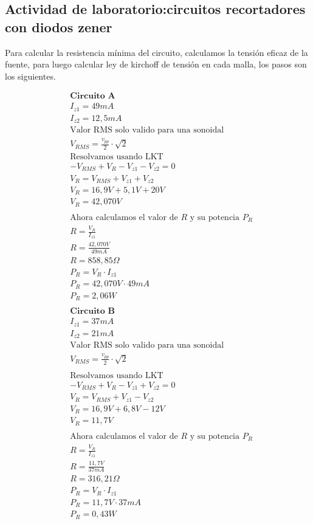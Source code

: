 	\subsection{Actividad de laboratorio:circuitos recortadores con diodos zener}
	\sangria{} Para calcular la resistencia mínima del circuito, calculamos la tensión eficaz de la fuente, para luego calcular ley de kirchoff de tensión en cada malla, los pasos son los siguientes.

\newpage

	\begin{align*}
	&\textbf{Circuito A}\\
	&I_{z1} = 49mA\\
	&I_{z2} = 12,5mA\\
	&\text{Valor RMS solo valido para una sonoidal}\\
	&V_{RMS}=\frac{v_{pp}}{2} \cdot \sqrt{2}\\
	&\text{Resolvamos usando LKT}\\
	&-V_{RMS}+V_{R}-V_{z1}-V_{z2}=0\\
	&V_{R}=V_{RMS}+V_{z1}+V_{z2}\\
	&V_{R}=16,9V+5,1V+20V\\
	&V_{R}=42,070V\\
	\\
	&\text{Ahora calculamos el valor de $R$ y su potencia $P_{R}$}\\
	&R=\frac{V_{R}}{I_{z1}}\\
	&R=\frac{42,070V}{49mA}\\
	&R=858,85\Omega \\
	&P_{R}=V_{R} \cdot I_{z1}\\
	&P_{R}=42,070V \cdot 49mA\\
	&P_{R}=2,06W\\
	\\
	&\textbf{Circuito B}\\
	&I_{z1} = 37mA\\
	&I_{z2} = 21mA\\
	&\text{Valor RMS solo valido para una sonoidal}\\
	&V_{RMS}=\frac{v_{pp}}{2} \cdot \sqrt{2}\\
	\\
	&\text{Resolvamos usando LKT}\\
	&-V_{RMS}+V_{R}-V_{z1}+V_{z2}=0\\
	&V_{R}=V_{RMS}+V_{z1}-V_{z2}\\
	&V_{R}=16,9V+6,8V-12V\\
	&V_{R}=11,7V\\
	\\
	&\text{Ahora calculamos el valor de $R$ y su potencia $P_{R}$}\\
	&R=\frac{V_{R}}{I_{z1}}\\
	&R=\frac{11,7V}{37mA}\\
	&R=316,21\Omega \\
	&P_{R}=V_{R} \cdot I_{z1}\\
	&P_{R}=11,7V \cdot 37mA\\
	&P_{R}=0,43W\\
	\end{align*}


